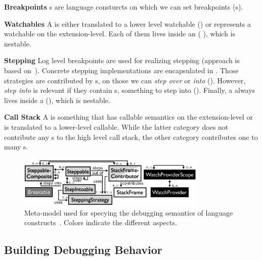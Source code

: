 \noindent \textbf{Breakpoints} s are language consturcts on which
we can set breakpoints (\eg {}s).

\noindent \textbf{Watchables} A  is either
translated to a lower level watchable (\eg  {}) or
represents a watchable on the extension-level.
Each of them lives inside an  (\eg
{}), which is nestable. 

\noindent \textbf{Stepping} Log level breakpoints are used for realizing
stepping (approach is based on~\cite{Wu06grammar}). Concrete
stepping implementations are encapsulated in
.
Those strategies are contributed by s, on those 
we can \emph{step over} or \emph{into} (\eg {}). 
However, \emph{step into} is relevant if 
they contain s, something to step into
(\eg {}). Finally, a  always lives inside a
 (\eg {}), which is nestable.

\noindent \textbf{Call Stack} A  is
something that has callable semantics on the extension-level or is
translated to a lower-level callable. While the latter category does not
contribute any s to the high level call stack, the other category
contributes one to many s.

\begin{figure}[h]
  \vspace{-2mm}
  \centering
    \includegraphics[width=9cm]{./figures/debugger-concepts.png} 
    \vspace{-2mm}
    \caption{Meta-model used for specying the debugging semantics of language
    constructs~\cite{DBLP:conf/adaEurope/AdaEuropeDeb}. Colors indicate the
    different aspects.} 
  \label{specabs}
  \vspace{-2mm}
\end{figure}

\subsection{Building Debugging Behavior}

